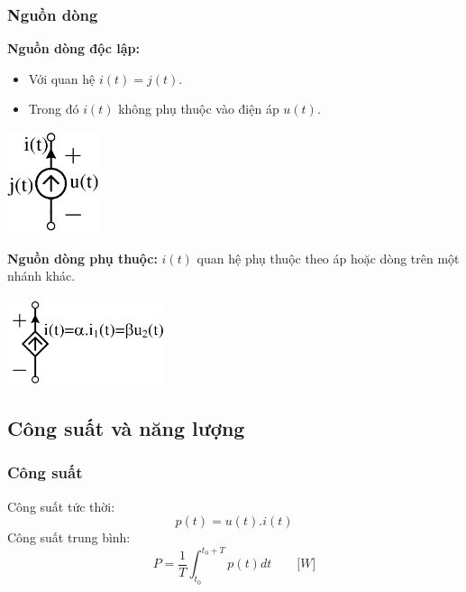 \subsubsection{Nguồn dòng}
\textbf{Nguồn dòng độc lập:} 
\begin{itemize}
  \item Với quan hệ $i(t)=j(t)$.
  \item Trong đó $i(t)$ không phụ thuộc vào điện áp $u(t)$.
\end{itemize}
\begin{center}
  \includegraphics[width=0.2\textwidth]{./image/11.png}
\end{center}
\textbf{Nguồn dòng phụ thuộc:} $i(t)$ quan hệ phụ thuộc theo áp hoặc dòng trên một nhánh khác.
\begin{center}
  \includegraphics[width=0.35\textwidth]{./image/12.png}
\end{center}
\subsection{Công suất và năng lượng}
\subsubsection{Công suất}
\noindent Công suất tức thời: 
\begin{equation}
  p(t)=u(t).i(t)
\end{equation}
Công suất trung bình: 
\begin{equation}
  P= \frac{1}{T}\int_{t_0}^{t_0 + T} p(t)dt \qquad \lbrack W\rbrack
\end{equation}
